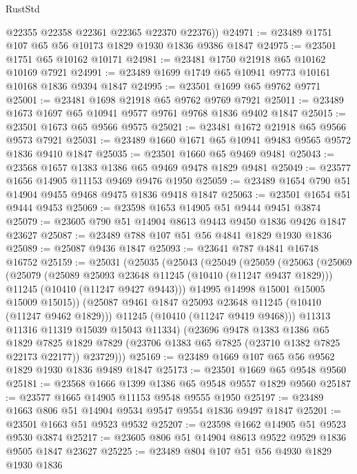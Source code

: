 \begin{lexlean}{RustStd}
\begin{coremodule}
        @22355
        @22358
        @22361
        @22365
        @22370
        @22376))
@24971 := @23489 @1751 @107 @65 @56 @10173 @1829 @1930 @1836 @9386 @1847
@24975 := @23501 @1751 @65 @10162 @10171
@24981 := @23481 @1750 @21918 @65 @10162 @10169 @7921
@24991 := @23489 @1699 @1749 @65 @10941 @9773 @10161 @10168 @1836 @9394 @1847
@24995 := @23501 @1699 @65 @9762 @9771
@25001 := @23481 @1698 @21918 @65 @9762 @9769 @7921
@25011 := @23489 @1673 @1697 @65 @10941 @9577 @9761 @9768 @1836 @9402 @1847
@25015 := @23501 @1673 @65 @9566 @9575
@25021 := @23481 @1672 @21918 @65 @9566 @9573 @7921
@25031 := @23489 @1660 @1671 @65 @10941 @9483 @9565 @9572 @1836 @9410 @1847
@25035 := @23501 @1660 @65 @9469 @9481
@25043 := @23568 @1657 @1383 @1386 @65 @9469 @9478 @1829 @9481
@25049 := @23577 @1656 @14905 @11153 @9469 @9476 @1950
@25059 := @23489 @1654 @790 @51 @14904 @9455 @9468 @9475 @1836 @9418 @1847
@25063 := @23501 @1654 @51 @9444 @9453
@25069 := @23598 @1653 @14905 @51 @9444 @9451 @3874
@25079 := @23605 @790 @51 @14904 @8613 @9443 @9450 @1836 @9426 @1847 @23627
@25087 := @23489 @788 @107 @51 @56 @4841 @1829 @1930 @1836
@25089 := @25087 @9436 @1847
@25093 := @23641 @787 @4841 @16748 @16752
@25159 := @25031
    (@25035
      (@25043
        (@25049
          (@25059
            (@25063
              (@25069
                (@25079
                  (@25089 @25093 @23648 @11245 (@10410 (@11247 @9437 @1829)))
                  @11245
                  (@10410 (@11247 @9427 @9443)))
                @14995
                @14998
                @15001
                @15005
                @15009
                @15015))
            (@25087 @9461 @1847 @25093 @23648 @11245 (@10410 (@11247 @9462 @1829)))
            @11245
            (@10410 (@11247 @9419 @9468)))
          @11313
          @11316
          @11319
          @15039
          @15043
          @11334)
        (@23696
          @9478
          @1383
          @1386
          @65
          @1829
          @7825
          @1829
          @7829
          (@23706 @1383 @65 @7825 (@23710 @1382 @7825 @22173 @22177))
          @23729)))
@25169 := @23489 @1669 @107 @65 @56 @9562 @1829 @1930 @1836 @9489 @1847
@25173 := @23501 @1669 @65 @9548 @9560
@25181 := @23568 @1666 @1399 @1386 @65 @9548 @9557 @1829 @9560
@25187 := @23577 @1665 @14905 @11153 @9548 @9555 @1950
@25197 := @23489 @1663 @806 @51 @14904 @9534 @9547 @9554 @1836 @9497 @1847
@25201 := @23501 @1663 @51 @9523 @9532
@25207 := @23598 @1662 @14905 @51 @9523 @9530 @3874
@25217 := @23605 @806 @51 @14904 @8613 @9522 @9529 @1836 @9505 @1847 @23627
@25225 := @23489 @804 @107 @51 @56 @4930 @1829 @1930 @1836

\end{coremodule}
\end{lexlean}

